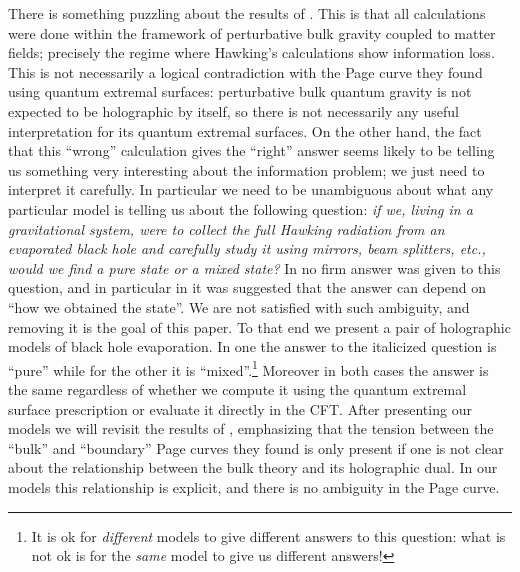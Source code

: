 \documentclass[12pt]{article}
\theoremstyle{definition}
\begin{document}
There is something puzzling about the results of \cite{Almheiri:2019psf,Penington:2019npb,Almheiri:2019hni}.  This is that all calculations were done within the framework of perturbative bulk gravity coupled to matter fields; precisely the regime where Hawking's calculations show information loss.  This is not necessarily a logical contradiction with the Page curve they found using quantum extremal surfaces: perturbative bulk quantum gravity is not expected to be holographic by itself, so there is not necessarily any useful interpretation for its quantum extremal surfaces.  On the other hand, the fact that this ``wrong'' calculation gives the ``right'' answer seems likely to be telling us something very interesting about the information problem; we just need to interpret it carefully.  In particular we need to be unambiguous about what any particular model is telling us about the following question: \textit{if we, living in a gravitational system, were to collect the full Hawking radiation from an evaporated black hole and carefully study it using mirrors, beam splitters, etc., would we find a pure state or a mixed state?}  In \cite{Almheiri:2019psf,Penington:2019npb,Almheiri:2019hni} no firm answer was given to this question, and in particular in \cite{Almheiri:2019hni} it was suggested that the answer can depend on ``how we obtained the state''.    We are not satisfied with such ambiguity, and removing it is the goal of this paper.  To that end we present a pair of holographic models of black hole evaporation. In one the answer to the italicized question is ``pure'' while for the other it is ``mixed''.\footnote{It is ok for \textit{different} models to give different answers to this question: what is not ok is for the \textit{same} model to give us different answers!}  Moreover in both cases the answer is the same regardless of whether we compute it using the quantum extremal surface prescription or evaluate it directly in the CFT.  After presenting our models we will revisit the results of \cite{Almheiri:2019psf,Penington:2019npb,Almheiri:2019hni}, emphasizing that the tension between the ``bulk'' and ``boundary'' Page curves they found is only present if one is not clear about the relationship between the bulk theory and its holographic dual.   In our models this relationship is explicit, and there is no ambiguity in the Page curve.  
\end{document}
